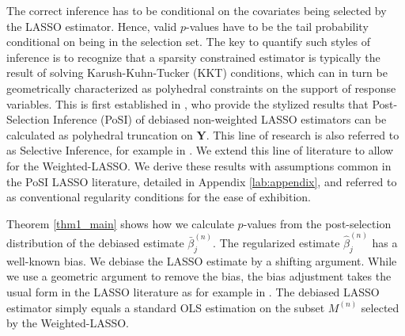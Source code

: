 \documentclass[11pt]{article}
\begin{document}
	
	The correct inference has to be conditional on the covariates being selected by the LASSO estimator. Hence, valid $p$-values have to be the tail probability conditional on being in the selection set. The key to quantify such styles of inference is to recognize that a sparsity constrained estimator is typically the result of solving Karush-Kuhn-Tucker (KKT) conditions, which can in turn be geometrically characterized as polyhedral constraints on the support of response variables. This is first established in \cite{lee2016exact}, who provide the stylized results that Post-Selection Inference (PoSI) of debiased non-weighted LASSO estimators can be calculated as polyhedral truncation on $\bm{Y}$. This line of research is also referred to as Selective Inference, for example in \cite{taylor2015statistical}.  We extend this line of literature to allow for the Weighted-LASSO. We derive these results with assumptions common in the PoSI LASSO literature, detailed in Appendix \ref{lab:appendix}, and referred to as conventional regularity conditions for the ease of exhibition.
	
	Theorem \ref{thm1_main} shows how we calculate $p$-values from the post-selection distribution of the debiased estimate $\bar{\beta}_j^{(n)}$. The regularized estimate $\hat{\beta}_j^{(n)}$ has a well-known bias. We debiase the LASSO estimate by a shifting argument. While we use a geometric argument to remove the bias, the bias adjustment takes the usual form in the LASSO literature as for example in \cite{10.3150/11-BEJ410}. The debiased LASSO estimator simply equals a standard OLS estimation on the subset $M^{(n)}$ selected by the Weighted-LASSO.
	
\end{document}
